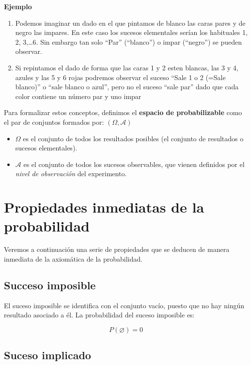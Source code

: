 \documentclass[
  a4paper,
  DIV=11,
  numbers=noendperiod]{scrreprt}
\providecommand{\tightlist}{%
  \setlength{\itemsep}{0pt}\setlength{\parskip}{0pt}}\usepackage{longtable,booktabs,array}
\begin{document}
\textbf{Ejemplo}

\begin{enumerate}
\def\labelenumi{\arabic{enumi}.}
\item
  Podemos imaginar un dado en el que pintamos de blanco las caras pares
  y de negro las impares. En este caso los sucesos elementales serían
  los habituales 1, 2, 3,\ldots6. Sin embargo tan solo ``Par''
  (``blanco'') o impar (``negro'') se pueden observar.
\item
  Si repintamos el dado de forma que las caras 1 y 2 esten blancas, las
  3 y 4, azules y las 5 y 6 rojas podremos observar el suceso ``Sale 1 o
  2 (=Sale blanco)'' o ``sale blanco o azul'', pero no el suceso ``sale
  par'' dado que cada color contiene un número par y uno impar
\end{enumerate}

Para formalizar estos conceptos, definimos el \textbf{espacio de
probabilizable} como el par de conjuntos formados por:
\((\Omega, \mathcal{A})\)

\begin{itemize}
\tightlist
\item
  \(\Omega\) es el conjunto de todos los resultados posibles (el
  conjunto de resultados o sucesos elementales).
\item
  \(\mathcal{A}\) es el conjunto de todos los sucesos observables, que
  vienen definidos por el \emph{nivel de observación} del experimento.
\end{itemize}

\section{Propiedades inmediatas de la
probabilidad}\label{propiedades-inmediatas-de-la-probabilidad}

Veremos a continuación una serie de propiedades que se deducen de manera
inmediata de la axiomática de la probabilidad.

\subsection{Succeso imposible}\label{succeso-imposible}

El suceso imposible se identifica con el conjunto vacío, puesto que no
hay ningún resultado asociado a él. La probabilidad del suceso imposible
es:

\[
P(\varnothing)=0
\]

\subsection{Suceso implicado}\label{suceso-implicado}
\end{document}
